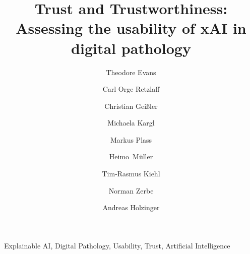 \documentclass[final,5p,times,twocolumn,hyphens]{elsarticle}
\def\corref#1{}%
\begin{document}
\begin{frontmatter}

\title{Trust and Trustworthiness: Assessing the usability of xAI in digital pathology}

\author[TUB]{Theodore Evans\corref{mycorrespondingauthor}}
\author[TUB]{Carl Orge Retzlaff}
\author[TUB]{Christian Geißler}
\author[MUG]{Michaela Kargl}
\author[MUG]{Markus Plass}
\author[MUG]{Heimo~M{\"u}ller}
\author[CAR]{Tim-Rasmus Kiehl}
\author[CAR]{Norman Zerbe}
\author[MUG]{Andreas Holzinger }

\address[TUB]{DAI-Labor, Technical University Berlin, Germany}
\address[MUG]{Medical University Graz, Austria}
\address[CAR]{Charité – Universit{\"a}tsmedizin Berlin, corporate member of Freie Universit{\"a}t Berlin and Humboldt- Universit{\"a}t zu Berlin, Institute of Pathology, Germany}

\begin{abstract} 
\end{abstract}

\begin{keyword}
Explainable AI, Digital Pathology, Usability, Trust, Artificial Intelligence
\end{keyword}

\end{frontmatter}
\linenumbers

 

 

 




\end{document}
